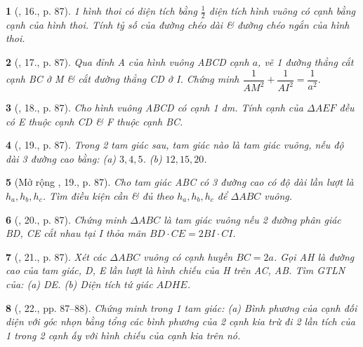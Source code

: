 \documentclass{article}
\newtheorem{baitoan}{}
\begin{document}
\begin{baitoan}[\cite{Binh_Toan_9_tap_1}, 16., p. 87]
	1 hình thoi có diện tích bằng $\frac{1}{2}$ diện tích hình vuông có cạnh bằng cạnh của hình thoi. Tính tỷ số của đường chéo dài \& đường chéo ngắn của hình thoi.
\end{baitoan}

\begin{baitoan}[\cite{Binh_Toan_9_tap_1}, 17., p. 87]
	Qua đỉnh A của hình vuông ABCD cạnh $a$, vẽ 1 đường thẳng cắt cạnh BC ở M \& cắt đường thẳng CD ở I. Chứng minh $\dfrac{1}{AM^2} + \dfrac{1}{AI^2} = \dfrac{1}{a^2}$.
\end{baitoan}

\begin{baitoan}[\cite{Binh_Toan_9_tap_1}, 18., p. 87]
	Cho hình vuông ABCD có cạnh {\rm1 dm}. Tính cạnh của $\Delta AEF$ đều có E thuộc cạnh CD \& F thuộc cạnh BC.
\end{baitoan}

\begin{baitoan}[\cite{Binh_Toan_9_tap_1}, 19., p. 87]
	Trong 2 tam giác sau, tam giác nào là tam giác vuông, nếu độ dài 3 đường cao bằng: (a) $3,4,5$. (b) $12,15,20$.
\end{baitoan}

\begin{baitoan}[Mở rộng \cite{Binh_Toan_9_tap_1}, 19., p. 87]
	Cho tam giác ABC có 3 đường cao có độ dài lần lượt là $h_a,h_b,h_c$. Tìm điều kiện cần \& đủ theo $h_a,h_b,h_c$ để $\Delta ABC$ vuông.
\end{baitoan}

\begin{baitoan}[\cite{Binh_Toan_9_tap_1}, 20., p. 87]
	Chứng minh $\Delta ABC$ là tam giác vuông nếu 2 đường phân giác BD, CE cắt nhau tại I thỏa mãn $BD\cdot CE = 2BI\cdot CI$.
\end{baitoan}

\begin{baitoan}[\cite{Binh_Toan_9_tap_1}, 21., p. 87]
	Xét các $\Delta ABC$ vuông có cạnh huyền $BC = 2a$. Gọi AH là đường cao của tam giác, D, E lần lượt là hình chiếu của H trên AC, AB. Tìm {\rm GTLN} của: (a) DE. (b) Diện tích tứ giác $ADHE$.
\end{baitoan}

\begin{baitoan}[\cite{Binh_Toan_9_tap_1}, 22., pp. 87--88]
	Chứng minh trong 1 tam giác: (a) Bình phương của cạnh đối diện với góc nhọn bằng tổng các bình phương của 2 cạnh kia trừ đi 2 lần tích của 1 trong 2 cạnh ấy với hình chiếu của cạnh kia trên nó.
\end{baitoan}
\end{document}
